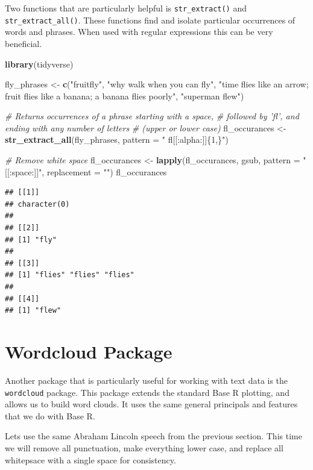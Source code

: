 \documentclass[
]{book}
\newenvironment{Shaded}{\begin{snugshade}}{\end{snugshade}}
\newcommand{\CommentTok}[1]{\textcolor[rgb]{0.56,0.35,0.01}{\textit{#1}}}
\newcommand{\DataTypeTok}[1]{\textcolor[rgb]{0.13,0.29,0.53}{#1}}
\newcommand{\KeywordTok}[1]{\textcolor[rgb]{0.13,0.29,0.53}{\textbf{#1}}}
\newcommand{\NormalTok}[1]{#1}
\newcommand{\StringTok}[1]{\textcolor[rgb]{0.31,0.60,0.02}{#1}}
\begin{document}
Two functions that are particularly helpful is \texttt{str\_extract()} and \texttt{str\_extract\_all()}. These functions find and isolate particular occurrences of words and phrases. When used with regular expressions this can be very beneficial.

\begin{Shaded}
\begin{Highlighting}[]
\KeywordTok{library}\NormalTok{(tidyverse)}

\NormalTok{fly_phrases <-}\StringTok{ }\KeywordTok{c}\NormalTok{(}\StringTok{"fruitfly"}\NormalTok{, }\StringTok{"why walk when you can fly"}\NormalTok{, }\StringTok{"time flies like an arrow; fruit flies like a banana; a banana flies poorly"}\NormalTok{,}
    \StringTok{"superman flew"}\NormalTok{)}

\CommentTok{# Returns occurrences of a phrase starting with a space,}
\CommentTok{# followed by 'fl', and ending with any number of letters}
\CommentTok{# (upper or lower case)}
\NormalTok{fl_occurances <-}\StringTok{ }\KeywordTok{str_extract_all}\NormalTok{(fly_phrases, }\DataTypeTok{pattern =} \StringTok{" fl[[:alpha:]]\{1,\}"}\NormalTok{)}

\CommentTok{# Remove white space}
\NormalTok{fl_occurances <-}\StringTok{ }\KeywordTok{lapply}\NormalTok{(fl_occurances, gsub, }\DataTypeTok{pattern =} \StringTok{"[[:space:]]"}\NormalTok{,}
    \DataTypeTok{replacement =} \StringTok{""}\NormalTok{)}
\NormalTok{fl_occurances}
\end{Highlighting}
\end{Shaded}

\begin{verbatim}
## [[1]]
## character(0)
## 
## [[2]]
## [1] "fly"
## 
## [[3]]
## [1] "flies" "flies" "flies"
## 
## [[4]]
## [1] "flew"
\end{verbatim}

\hypertarget{wordcloud-package-1}{%
\section{Wordcloud Package}\label{wordcloud-package-1}}

Another package that is particularly useful for working with text data is the \texttt{wordcloud} package. This package extends the standard Base R plotting, and allows us to build word clouds. It uses the same general principals and features that we do with Base R.

Lets use the same Abraham Lincoln speech from the previous section. This time we will remove all punctuation, make everything lower case, and replace all whitepsace with a single space for consistency.
\end{document}
